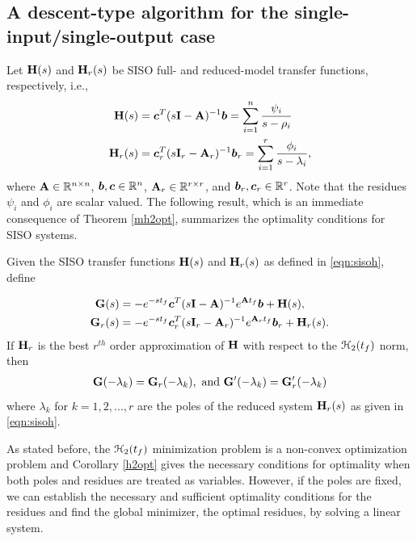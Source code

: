 \documentclass[twocolumn]{autart}
\begin{document}
\subsection{A descent-type algorithm for the single-input/single-output case}
Let $\mathbf{H}(s)$ and $\mathbf{H}_r(s)$ be SISO full- and reduced-model transfer functions, respectively, i.e.,
\begin{equation} \label{eqn:sisoh}
\begin{aligned}
\mathbf{H}(s) &=  {\boldsymbol{c}}^T(s\mathbf{I}-\mathbf{A})^{-1}{\boldsymbol{b}} = \sum_{i=1}^n \frac{\psi_i}{s-\rho_i}\\
\mathbf{H}_r(s) &=  {\boldsymbol{c}}_r^T(s\mathbf{I}_r-\mathbf{A}_r)^{-1}{\boldsymbol{b}}_r = \sum_{i=1}^r \frac{\phi_i}{s-\lambda_i},
\end{aligned}
\end{equation}
where $\mathbf{A} \in \mathbb{R}^{n\times n}$, ${\boldsymbol{b}},{\boldsymbol{c}} \in \mathbb{R}^n$, $\mathbf{A}_r \in \mathbb{R}^{r\times r}$, and 
${\boldsymbol{b}}_r,{\boldsymbol{c}}_r \in \mathbb{R}^r$. Note that the residues $\psi_i$ and $\phi_i$ are scalar valued.
The following result, which is an immediate consequence of Theorem \ref{mh2opt}, summarizes the optimality conditions for SISO systems.
\begin{corollary}\label{h2opt}
Given the SISO transfer functions $\mathbf{H}(s)$ and $\mathbf{H}_r(s)$ as defined in \eqref{eqn:sisoh}, define

\begin{align*}
\mathbf{G}(s)&=-e^{-s{t_f}}{\boldsymbol{c}}^T(s\mathbf{I}-\mathbf{A})^{-1}e^{\mathbf{A} {t_f}}{\boldsymbol{b}}+\mathbf{H}(s),\\
\mathbf{G}_r(s)&=-e^{-s{t_f}}{\boldsymbol{c}}^T_r(s\mathbf{I}_r-\mathbf{A}_r)^{-1}e^{\mathbf{A}_r {t_f}}{\boldsymbol{b}}_r+\mathbf{H}_r(s).
\end{align*}
If $\mathbf{H}_r$ is the best $r^{th}$ order approximation of $\mathbf{H}$ with respect to the $\EuScript{H}_2({t_f})$ norm, then
\begin{align} \label{def:GGrsiso}
\mathbf{G}(-\lambda_k)=\mathbf{G}_r(-\lambda_k),\ \mbox{and}\
\mathbf{G}'(-\lambda_k)=\mathbf{G}_r'(-\lambda_k)
\end{align}
where  $\lambda_k$ for $k=1, 2, ... , r$ are the poles of the reduced system $\mathbf{H}_r(s)$ as given in
 \eqref{eqn:sisoh}.
\end{corollary}
As stated before, the $\EuScript{H}_2(t_f)$ minimization problem is a non-convex optimization problem and 
Corollary \ref{h2opt} gives the necessary conditions for optimality when both  poles and residues are treated as variables. However, if the poles are fixed, we can establish the necessary and sufficient optimality conditions for the residues and find the global minimizer,  the optimal residues, by solving a linear system.
\end{document}
